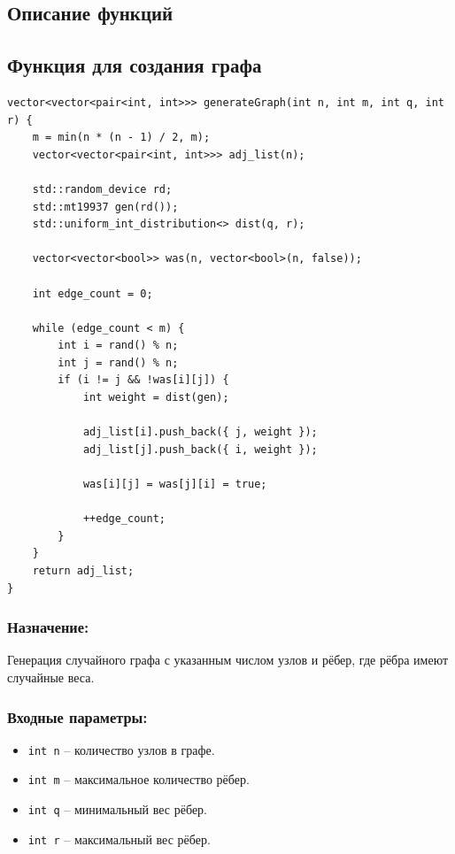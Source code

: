 \subsection{Описание функций}

\subsection*{Функция для создания графа}
\begin{verbatim}
vector<vector<pair<int, int>>> generateGraph(int n, int m, int q, int r) {
    m = min(n * (n - 1) / 2, m);
    vector<vector<pair<int, int>>> adj_list(n);

    std::random_device rd;
    std::mt19937 gen(rd());
    std::uniform_int_distribution<> dist(q, r);

    vector<vector<bool>> was(n, vector<bool>(n, false));

    int edge_count = 0;

    while (edge_count < m) {
        int i = rand() % n;
        int j = rand() % n;
        if (i != j && !was[i][j]) {
            int weight = dist(gen);

            adj_list[i].push_back({ j, weight });
            adj_list[j].push_back({ i, weight });

            was[i][j] = was[j][i] = true;

            ++edge_count;
        }
    }
    return adj_list;
}
\end{verbatim}

\subsubsection*{Назначение:}
Генерация случайного графа с указанным числом узлов и рёбер, где рёбра имеют случайные веса.

\subsubsection*{Входные параметры:}
\begin{itemize}
    \item \texttt{int n} -- количество узлов в графе.
    \item \texttt{int m} -- максимальное количество рёбер.
    \item \texttt{int q} -- минимальный вес рёбер.
    \item \texttt{int r} -- максимальный вес рёбер.
\end{itemize}

